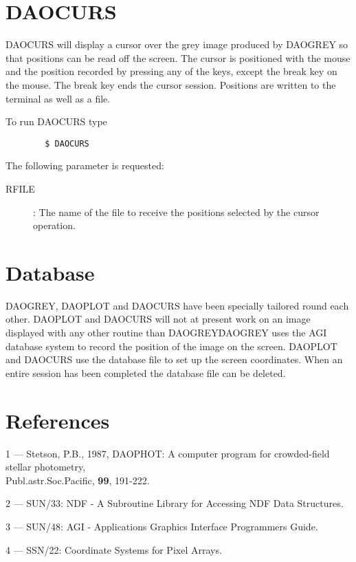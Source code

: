 \section{DAOCURS}

DAOCURS will display a cursor over the grey image produced by DAOGREY so that
positions can be read off the screen.
The cursor is positioned with the mouse and the position recorded
by pressing any of the keys, except the break key on the mouse.
The break key ends the cursor session.
Positions are written to the terminal as well as a file.

To run DAOCURS type
\begin{verbatim}
        $ DAOCURS
\end{verbatim}
The following parameter is requested:
\begin{description}
\begin{description}
\item[RFILE] :
The name of the file to receive the positions selected by the cursor operation.
\end{description}
\end{description}

\section{Database}

DAOGREY, DAOPLOT and DAOCURS have been specially tailored round each other.
DAOPLOT and DAOCURS will not at present work on an image displayed with any
other routine than DAOGREY\. DAOGREY uses the AGI database system to record the
position of the image on the screen. DAOPLOT and DAOCURS use the database file
to set up the screen coordinates. When an entire session has been completed the
database file can be deleted.

\section{References}

1 --- Stetson, P.B., 1987, DAOPHOT: A computer program for crowded-field
stellar photometry, \\
\hspace*{2.0em} Publ.astr.Soc.Pacific, {\bf 99}, 191-222.

2 --- SUN/33: NDF - A Subroutine Library for Accessing NDF Data Structures.

3 --- SUN/48: AGI - Applications Graphics Interface Programmers Guide.

4 --- SSN/22: Coordinate Systems for Pixel Arrays.


